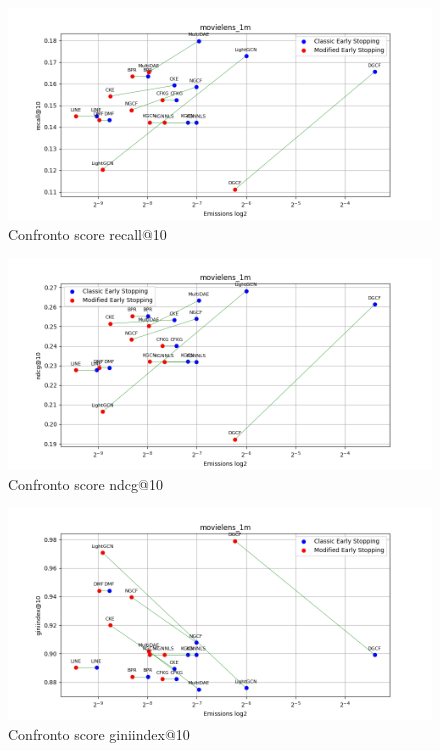 \begin{figure}[H]
    \centering
    \includegraphics[width=\linewidth, trim=0 0 0 0]{images/recall@10_movielens_1m_30_7_comparison.png}
    \caption{Confronto score recall@10}
    
\end{figure}

\begin{figure}[H]
    \centering
    \includegraphics[width=\linewidth, trim=0 0 0 0]{images/ndcg@10_movielens_1m_30_7_comparison.png}
    \caption{Confronto score ndcg@10}
    
\end{figure}

\begin{figure}[H]
    \centering
    \includegraphics[width=\linewidth, trim=0 0 0 0]{images/giniindex@10_movielens_1m_30_7_comparison.png}
    \caption{Confronto score giniindex@10}
\end{figure}

